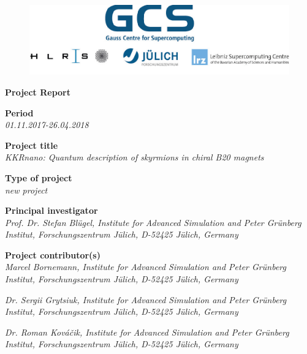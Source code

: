 \documentclass [a4paper, 12pt]{article}
\begin{document}
 
\begin{figure}[H]
\begin{center}
  \includegraphics[scale=0.45]{Figures/GCS-hlrs-fzj-lrz.jpg}\\
\end{center}
\end{figure}

\begin{center}
{\LARGE \bf Project Report} \\

\bigskip
\bigskip
\bigskip
\end{center}
\textbf{Period}\\
\phantom{MM}\textit{01.11.2017-26.04.2018}

\bigskip
\textbf{Project title}\\
\phantom{MM}\textit{KKRnano: Quantum description of skyrmions in chiral B20 magnets}

\bigskip
\textbf{Type of project}\\
\phantom{MM} \textit{new project}


\bigskip
\textbf{Principal investigator}\\
\phantom{MM} \textit{ Prof. Dr. Stefan Bl{\"u}gel,
Institute for Advanced Simulation and Peter Gr\"unberg Institut, Forschungszentrum J\"ulich, D-52425 J\"ulich, Germany
}

\bigskip
\textbf{Project contributor(s)}\\

\phantom{MM} \textit{Marcel Bornemann,
Institute for Advanced Simulation and Peter Gr\"unberg Institut, Forschungszentrum J\"ulich, D-52425 J\"ulich, Germany
}

\phantom{MM} \textit{Dr. Sergii Grytsiuk,
Institute for Advanced Simulation and Peter Gr\"unberg Institut, Forschungszentrum J\"ulich, D-52425 J\"ulich, Germany
}

\phantom{MM} \textit{Dr. Roman Kováčik,
Institute for Advanced Simulation and Peter Gr\"unberg Institut, Forschungszentrum J\"ulich, D-52425 J\"ulich, Germany
}
\end{document}
